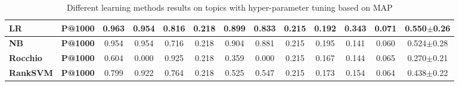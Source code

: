 \begin{table*}[t]
{{\begin{tabular}{|l|l|c|c|c|c|c|c|c|c|c|c|c|}
\textbf{LR} & \textbf{P@1000} & 0.963 & 0.954 & 0.816 & 0.218 & 0.899 & 0.833 & 0.215 & 0.192 & 0.343 & 0.071 & 0.550$\pm$0.26 \\ \hline
\textbf{NB} & \textbf{P@1000} & 0.954 & 0.954 & 0.716 & 0.218 & 0.904 & 0.881 & 0.215 & 0.195 & 0.141 & 0.060 & 0.524$\pm$0.28 \\ \hline
\textbf{Rocchio} & \textbf{P@1000} & 0.604 & 0.000 & 0.925 & 0.218 & 0.359 & 0.000 & 0.215 & 0.167 & 0.144 & 0.065 & 0.270$\pm$0.21 \\ \hline
\textbf{RankSVM} & \textbf{P@1000} & 0.799 & 0.922 & 0.764 & 0.218 & 0.525 & 0.547 & 0.215 & 0.173 & 0.154 & 0.064 & 0.438$\pm$0.22 \\ \hline
\end{tabular}
}}
\caption{Different learning methods results on topics with hyper-parameter tuning based on MAP}
\label{table:results2}
\end{table*}

